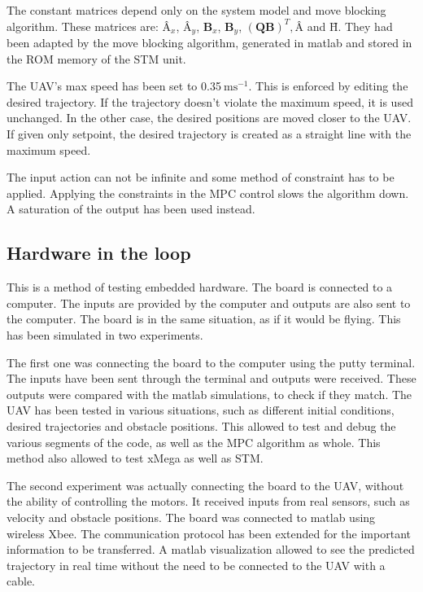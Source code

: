 \documentclass{article}
\newcommand{\jed}[1]{\ensuremath{~\mathrm{#1}}}
\begin{document}
The constant matrices depend only on the system model and move blocking algorithm. These matrices are: $\textbf{\^A}_x$, $\textbf{\^A}_y$, $\textbf{\^B}_x$, $\textbf{\^B}_y$, $(\textbf{\^Q}\textbf{\^B})^T, \textbf{\^A}$ and $\textbf{\^H}$. They had been adapted by the move blocking algorithm, generated in matlab and stored in the ROM memory of the STM unit. 

The UAV's max speed has been set to 0.35\jed{ms^{-1}}. This is enforced by editing the desired trajectory. If the trajectory doesn't violate the maximum speed, it is used unchanged. In the other case, the desired positions are moved closer to the UAV. If given only setpoint, the desired trajectory is created as a straight line with the maximum speed. 

The input action can not be infinite and some method of constraint has to be applied. Applying the constraints in the MPC control slows the algorithm down. A saturation of the output has been used instead.


\subsection{Hardware in the loop}
This is a method of testing embedded hardware. The board is connected to a computer. The inputs are provided by the computer and outputs are also sent to the computer. The board is in the same situation, as if it would be flying. This has been simulated in two experiments. 

The first one was connecting the board to the computer using the putty terminal. The inputs have been sent through the terminal and outputs were received. These outputs were compared with the matlab simulations, to check if they match. The UAV has been tested in various situations, such as different initial conditions, desired trajectories and obstacle positions. This allowed to test and debug the various segments of the code, as well as the MPC algorithm as whole. This method also allowed to test xMega as well as STM.

The second experiment was actually connecting the board to the UAV, without the ability of controlling the motors. It received inputs from real sensors, such as velocity and obstacle positions. The board was connected to matlab using wireless Xbee. The communication protocol has been extended for the important information to be transferred. A matlab visualization allowed to see the predicted trajectory in real time without the need to be connected to the UAV with a cable. 
\end{document}
